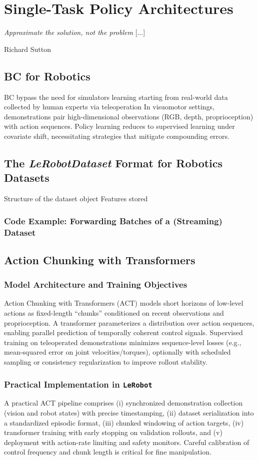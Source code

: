 \section{Single-Task Policy Architectures}
\label{sec:single}

\epigraph{\textit{Approximate the solution, not the problem} [...]}{Richard Sutton}

\subsection{BC for Robotics}
BC bypass the need for simulators learning starting from real-world data collected by human experts via teleoperation
In visuomotor settings, demonstrations pair high-dimensional observations (RGB, depth, proprioception) with action sequences. 
Policy learning reduces to supervised learning under covariate shift, necessitating strategies that mitigate compounding errors.

\subsection{The \textit{LeRobotDataset} Format for Robotics Datasets}
Structure of the dataset object
Features stored

\subsubsection{Code Example: Forwarding Batches of a (Streaming) Dataset}

\subsection{Action Chunking with Transformers}
\subsubsection{Model Architecture and Training Objectives}
Action Chunking with Transformers (ACT) models short horizons of low-level actions as fixed-length ``chunks'' conditioned on recent observations and proprioception. A transformer parameterizes a distribution over action sequences, enabling parallel prediction of temporally coherent control signals. Supervised training on teleoperated demonstrations minimizes sequence-level losses (e.g., mean-squared error on joint velocities/torques), optionally with scheduled sampling or consistency regularization to improve rollout stability.

\subsubsection{Practical Implementation in \texttt{LeRobot}}
A practical ACT pipeline comprises (i) synchronized demonstration collection (vision and robot states) with precise timestamping, (ii) dataset serialization into a standardized episodic format, (iii) chunked windowing of action targets, (iv) transformer training with early stopping on validation rollouts, and (v) deployment with action-rate limiting and safety monitors. Careful calibration of control frequency and chunk length is critical for fine manipulation.

